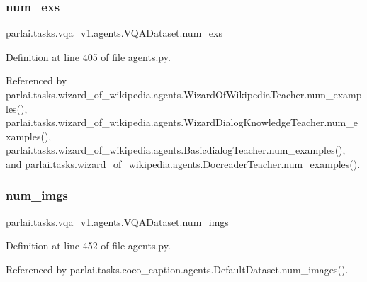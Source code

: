 \subsubsection{\texorpdfstring{num\+\_\+exs}{num\_exs}}
{\footnotesize\ttfamily parlai.\+tasks.\+vqa\+\_\+v1.\+agents.\+V\+Q\+A\+Dataset.\+num\+\_\+exs}



Definition at line 405 of file agents.\+py.



Referenced by parlai.\+tasks.\+wizard\+\_\+of\+\_\+wikipedia.\+agents.\+Wizard\+Of\+Wikipedia\+Teacher.\+num\+\_\+examples(), parlai.\+tasks.\+wizard\+\_\+of\+\_\+wikipedia.\+agents.\+Wizard\+Dialog\+Knowledge\+Teacher.\+num\+\_\+examples(), parlai.\+tasks.\+wizard\+\_\+of\+\_\+wikipedia.\+agents.\+Basicdialog\+Teacher.\+num\+\_\+examples(), and parlai.\+tasks.\+wizard\+\_\+of\+\_\+wikipedia.\+agents.\+Docreader\+Teacher.\+num\+\_\+examples().

\mbox{\label{classparlai_1_1tasks_1_1vqa__v1_1_1agents_1_1VQADataset_a81a7563d63356706c61e51a188e09c4f}} 
\subsubsection{\texorpdfstring{num\+\_\+imgs}{num\_imgs}}
{\footnotesize\ttfamily parlai.\+tasks.\+vqa\+\_\+v1.\+agents.\+V\+Q\+A\+Dataset.\+num\+\_\+imgs}



Definition at line 452 of file agents.\+py.



Referenced by parlai.\+tasks.\+coco\+\_\+caption.\+agents.\+Default\+Dataset.\+num\+\_\+images().

\mbox{\label{classparlai_1_1tasks_1_1vqa__v1_1_1agents_1_1VQADataset_a0af1b5bdd7f93896ab44f4d90be56fdf}} 
